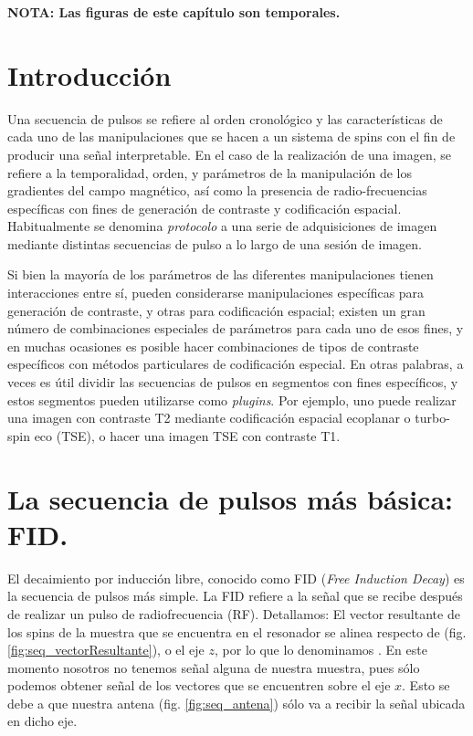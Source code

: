 
\textbf{NOTA: Las figuras de este capítulo son temporales.}


\section{Introducción}
Una secuencia de pulsos se refiere al orden cronológico y las características de cada uno de las manipulaciones que se hacen a un sistema de spins con el fin de producir una señal interpretable. En el caso de la realización de una imagen, se refiere a la temporalidad, orden, y parámetros de la manipulación de los gradientes del campo magnético, así como la presencia de radio-frecuencias específicas con fines de generación de contraste y codificación espacial. Habitualmente se denomina \textit{protocolo} a una serie de adquisiciones de imagen mediante distintas secuencias de pulso a lo largo de una sesión de imagen.

Si bien la mayoría de los parámetros de las diferentes manipulaciones tienen interacciones entre sí, pueden considerarse manipulaciones específicas para generación de contraste, y otras para codificación espacial; existen un gran número de combinaciones especiales de parámetros para cada uno de esos fines, y en muchas ocasiones es posible hacer combinaciones de tipos de contraste específicos con métodos particulares de codificación especial. En otras palabras, a veces es útil dividir las secuencias de pulsos en segmentos con fines específicos, y estos segmentos pueden utilizarse como \textit{plugins}. Por ejemplo, uno puede realizar una imagen con contraste T2 mediante codificación espacial ecoplanar o turbo-spin eco (TSE), o hacer una imagen TSE con contraste T1.

\section{La secuencia de pulsos más básica: FID.}

El decaimiento por inducción libre, conocido como FID (\textit{Free Induction Decay}) es la secuencia de pulsos más simple. La FID refiere a la señal que se recibe después de realizar un pulso de radiofrecuencia (RF). Detallamos: El vector resultante de los spins de la muestra que se encuentra en el resonador se alinea respecto de \Bzero (fig. \ref{fig:seq_vectorResultante}), o el eje $z$, por lo que lo denominamos \Mz. En este momento nosotros no tenemos señal alguna de nuestra muestra, pues sólo podemos obtener señal de los vectores que se encuentren sobre el eje $x$. Esto se debe a que nuestra antena (fig. \ref{fig:seq_antena}) sólo va a recibir la señal ubicada en dicho eje. 


